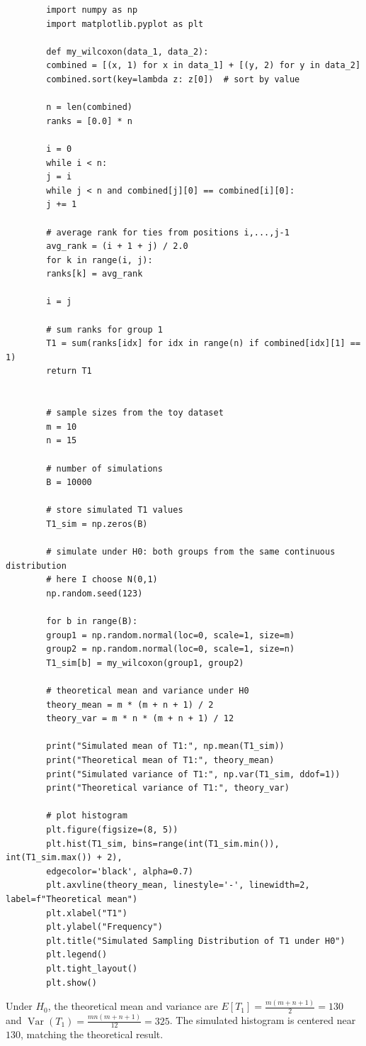 \documentclass[letterpaper]{article}
\begin{document}
	\begin{lstlisting}
		import numpy as np
		import matplotlib.pyplot as plt
		
		def my_wilcoxon(data_1, data_2):
		combined = [(x, 1) for x in data_1] + [(y, 2) for y in data_2]
		combined.sort(key=lambda z: z[0])  # sort by value
		
		n = len(combined)
		ranks = [0.0] * n
		
		i = 0
		while i < n:
		j = i
		while j < n and combined[j][0] == combined[i][0]:
		j += 1
		
		# average rank for ties from positions i,...,j-1
		avg_rank = (i + 1 + j) / 2.0
		for k in range(i, j):
		ranks[k] = avg_rank
		
		i = j
		
		# sum ranks for group 1
		T1 = sum(ranks[idx] for idx in range(n) if combined[idx][1] == 1)
		return T1
		
		
		# sample sizes from the toy dataset
		m = 10
		n = 15
		
		# number of simulations
		B = 10000
		
		# store simulated T1 values
		T1_sim = np.zeros(B)
		
		# simulate under H0: both groups from the same continuous distribution
		# here I choose N(0,1)
		np.random.seed(123)
		
		for b in range(B):
		group1 = np.random.normal(loc=0, scale=1, size=m)
		group2 = np.random.normal(loc=0, scale=1, size=n)
		T1_sim[b] = my_wilcoxon(group1, group2)
		
		# theoretical mean and variance under H0
		theory_mean = m * (m + n + 1) / 2
		theory_var = m * n * (m + n + 1) / 12
		
		print("Simulated mean of T1:", np.mean(T1_sim))
		print("Theoretical mean of T1:", theory_mean)
		print("Simulated variance of T1:", np.var(T1_sim, ddof=1))
		print("Theoretical variance of T1:", theory_var)
		
		# plot histogram
		plt.figure(figsize=(8, 5))
		plt.hist(T1_sim, bins=range(int(T1_sim.min()), int(T1_sim.max()) + 2),
		edgecolor='black', alpha=0.7)
		plt.axvline(theory_mean, linestyle='-', linewidth=2, label=f"Theoretical mean")
		plt.xlabel("T1")
		plt.ylabel("Frequency")
		plt.title("Simulated Sampling Distribution of T1 under H0")
		plt.legend()
		plt.tight_layout()
		plt.show()
	\end{lstlisting}
	
	Under $H_0$, the theoretical mean and variance are
	$E[T_1]=\frac{m(m+n+1)}{2}=130$ and
	$\operatorname{Var}(T_1)=\frac{mn(m+n+1)}{12}=325$.
	The simulated histogram is centered near $130$, matching the theoretical result.
	
\end{document}
